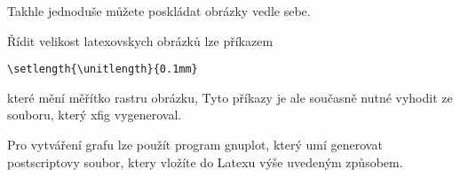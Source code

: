 \documentclass[12pt]{article}
\begin{document}
Takhle jednoduše můžete poskládat obrázky vedle sebe.
\begin{center}
\hglue 5mm
\hglue 5mm
\end{center}
Řídit velikost latexovskych obrázků lze příkazem
\begin{verbatim}
\setlength{\unitlength}{0.1mm}
\end{verbatim}
které mění měřítko rastru obrázku, Tyto příkazy je ale současně
nutné vyhodit ze souboru, který xfig vygeneroval.

Pro vytváření grafu lze použít program gnuplot, který umí generovat
postscriptovy soubor, ktery vložíte do Latexu výše uvedeným
způsobem.
\end{document}
